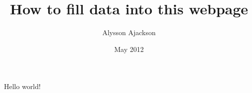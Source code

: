 \documentclass{article}
\title{How to fill data into this webpage}
\author{Alysson Ajackson}
\date{May 2012}
\begin{document}
\maketitle
Hello world!
\end{document}
